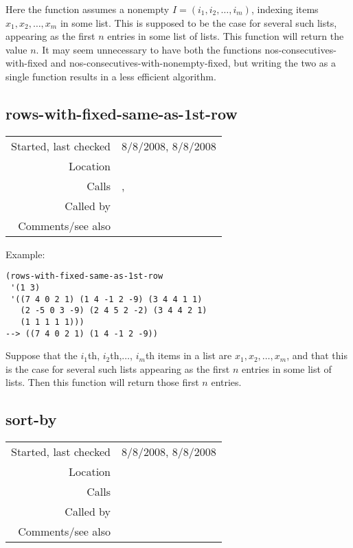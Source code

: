 \noindent Here the function assumes a nonempty
$I = (i_1, i_2,\ldots, i_m)$, indexing items $x_1,
x_2,\ldots, x_m$ in some list. This is supposed to be
the case for several such lists, appearing as the
first $n$ entries in some list of lists. This function
will return the value $n$. It may seem unnecessary to
have both the functions nos-consecutives-with-fixed
and nos-consecutives-with-nonempty-fixed, but writing
the two as a single function results in a less
efficient algorithm.


\subsection*{rows-with-fixed-same-as-1st-row}\label{fun:rows-with-fixed-same-as-1st-row}

\vspace{0.3cm}
\begin{tabular}{r|p{8cm}}
Started, last checked & 8/8/2008, 8/8/2008 \\
Location & \nameref{sec:sort-by} \\
Calls & \nameref{fun:firstn}, \nameref{fun:nos-consecutives-with-fixed} \\
Called by & \nameref{fun:break-fixed-with-sort-by-col} \\
Comments/see also &
\end{tabular}

\vspace{0.5cm}
\noindent Example:
\begin{verbatim}
(rows-with-fixed-same-as-1st-row
 '(1 3)
 '((7 4 0 2 1) (1 4 -1 2 -9) (3 4 4 1 1)
   (2 -5 0 3 -9) (2 4 5 2 -2) (3 4 4 2 1)
   (1 1 1 1 1)))
--> ((7 4 0 2 1) (1 4 -1 2 -9))
\end{verbatim}

\noindent Suppose that the $i_1$th, $i_2$th,$\ldots$,
$i_m$th items in a list are $x_1, x_2,\ldots, x_m$,
and that this is the case for several such lists
appearing as the first $n$ entries in some list of
lists. Then this function will return those first $n$
entries.


\subsection*{sort-by}\label{fun:sort-by}

\vspace{0.3cm}
\begin{tabular}{r|p{8cm}}
Started, last checked & 8/8/2008, 8/8/2008 \\
Location & \nameref{sec:sort-by} \\
Calls & \nameref{fun:break-fixed-with-sort-by-col} \\
Called by & \\
Comments/see also &
\end{tabular}

